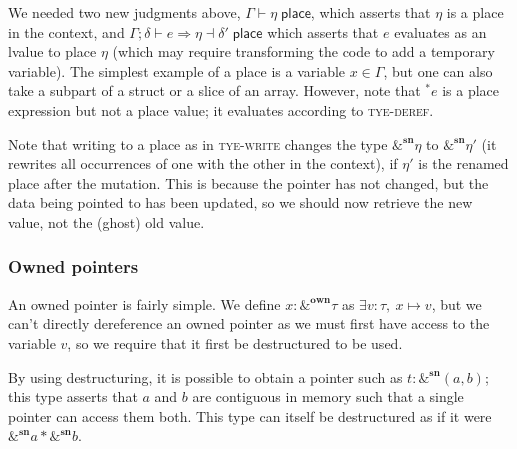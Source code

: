 \documentclass[acmsmall,nonacm]{acmart}
\newcommand*{\N}{\mathbb{N}}
\newcommand{\core}[1]{\left| #1 \right|}
\newcommand{\proves}{\vdash}
\newcommand{\makes}{\dashv}
\begin{document}
We needed two new judgments above, $\Gamma \proves \eta\;\mathsf{place}$, which asserts that $\eta$ is a place in the context, and $\Gamma;\delta \proves e\Rightarrow\eta\makes\delta'\;\mathsf{place}$ which asserts that $e$ evaluates as an lvalue to place $\eta$ (which may require transforming the code to add a temporary variable). The simplest example of a place is a variable $x\in\Gamma$, but one can also take a subpart of a struct or a slice of an array. However, note that ${}^*e$ is a place expression but not a place value; it evaluates according to \textsc{tye-deref}.

Note that writing to a place as in \textsc{tye-write} changes the type $\&^\mathbf{sn}\eta$ to $\&^\mathbf{sn}\eta'$ (it rewrites all occurrences of one with the other in the context), if $\eta'$ is the renamed place after the mutation. This is because the pointer has not changed, but the data being pointed to has been updated, so we should now retrieve the new value, not the (ghost) old value.

\subsubsection{Owned pointers}

An owned pointer is fairly simple. We define $\boxed{x:\&^\mathbf{own}\tau}$ as $\exists v:\tau,\ x\mapsto v$, but we can't directly dereference an owned pointer as we must first have access to the variable $v$, so we require that it first be destructured to be used.


By using destructuring, it is possible to obtain a pointer such as $t:\&^\mathbf{sn}(a,b)$; this type asserts that $a$ and $b$ are contiguous in memory such that a single pointer can access them both. This type can itself be destructured as if it were $\&^\mathbf{sn}a\ast \&^\mathbf{sn}b$.
\end{document}
